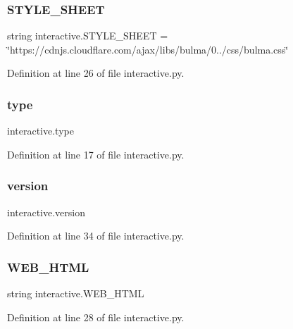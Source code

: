 \subsubsection{\texorpdfstring{S\+T\+Y\+L\+E\+\_\+\+S\+H\+E\+ET}{STYLE\_SHEET}}
{\footnotesize\ttfamily string interactive.\+S\+T\+Y\+L\+E\+\_\+\+S\+H\+E\+ET = \char`\"{}https\+://cdnjs.\+cloudflare.\+com/ajax/libs/bulma/0../css/bulma.\+css\char`\"{}}



Definition at line 26 of file interactive.\+py.

\mbox{\label{namespaceinteractive_a29ac438ce85aa9b2596889acd9d2e0fc}} 
\subsubsection{\texorpdfstring{type}{type}}
{\footnotesize\ttfamily interactive.\+type}



Definition at line 17 of file interactive.\+py.

\mbox{\label{namespaceinteractive_a878d19aeae208ee1dc94b3a9c651b443}} 
\subsubsection{\texorpdfstring{version}{version}}
{\footnotesize\ttfamily interactive.\+version}



Definition at line 34 of file interactive.\+py.

\mbox{\label{namespaceinteractive_aca168478a6c03b82e45d2fcb96536370}} 
\subsubsection{\texorpdfstring{W\+E\+B\+\_\+\+H\+T\+ML}{WEB\_HTML}}
{\footnotesize\ttfamily string interactive.\+W\+E\+B\+\_\+\+H\+T\+ML}



Definition at line 28 of file interactive.\+py.

